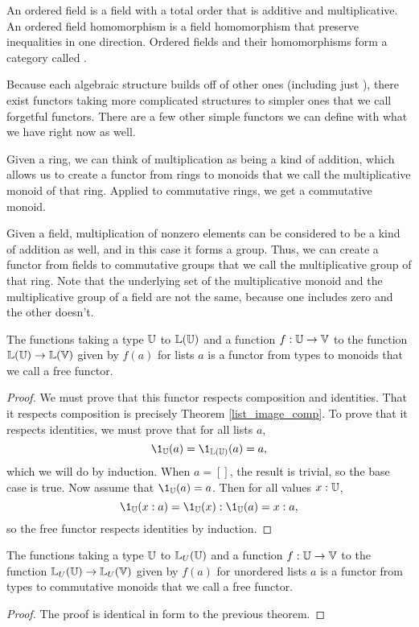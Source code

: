 \documentclass[../math.tex]{subfiles}
\begin{document}
\begin{definition}
    An ordered field is a field with a total order that is additive and
    multiplicative.  An ordered field homomorphism is a field homomorphism that
    preserve inequalities in one direction.  Ordered fields and their
    homomorphisms form a category called .
\end{definition}

Because each algebraic structure builds off of other ones (including just
\Type), there exist functors taking more complicated structures to simpler ones
that we call forgetful functors.  There are a few other simple functors we can
define with what we have right now as well.

\begin{definition}
    Given a ring, we can think of multiplication as being a kind of addition,
    which allows us to create a functor from rings to monoids that we call the
    multiplicative monoid of that ring.  Applied to commutative rings, we get a
    commutative monoid.
\end{definition}

\begin{definition}
    Given a field, multiplication of nonzero elements can be considered to be a
    kind of addition as well, and in this case it forms a group.  Thus, we can
    create a functor from fields to commutative groups that we call the
    multiplicative group of that ring.  Note that the underlying set of the
    multiplicative monoid and the multiplicative group of a field are not the
    same, because one includes zero and the other doesn't.
\end{definition}

\begin{theorem}
    The functions taking a type $\mathbb{U}$ to $\mathbb{L}(\mathbb{U})$ and a function $f : \mathbb{U} \to \mathbb{V}$
    to the function $\mathbb{L}(\mathbb{U}) \to \mathbb{L}(\mathbb{V})$ given by $f(a)$ for lists $a$ is a
    functor from types to monoids that we call a free functor.
\end{theorem}
\begin{proof}
    We must prove that this functor respects composition and identities.  That
    it respects composition is precisely Theorem \ref{list_image_comp}.  To
    prove that it respects identities, we must prove that for all lists $a$,
    \[
        \1_{\U}(a) = \1_{\L(\U)}(a) = a,
    \]
    which we will do by induction.  When $a = []$, the result is trivial, so the
    base case is true.  Now assume that $\1_{\U}(a) = a$.  Then for all values
    $x : \mathbb{U}$,
    \[
        \1_{\U}(x : a) = \1_{\U}(x) : \1_{\U}(a) = x : a,
    \]
    so the free functor respects identities by induction.
\end{proof}

\begin{theorem}
    The functions taking a type $\mathbb{U}$ to $\mathbb{L}_U(\mathbb{U})$ and a function $f : \mathbb{U} \to
    \mathbb{V}$ to the function $\mathbb{L}_U(\mathbb{U}) \to \mathbb{L}_U(\mathbb{V})$ given by $f(a)$ for unordered
    lists $a$ is a functor from types to commutative monoids that we call a free
    functor.
\end{theorem}
\begin{proof}
    The proof is identical in form to the previous theorem.
\end{proof}
\end{document}
